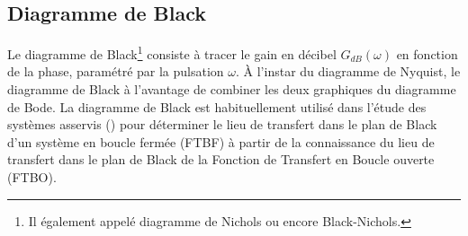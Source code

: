 \subsection{Diagramme de Black}
Le diagramme de Black\footnote{Il également appelé diagramme de Nichols ou encore Black-Nichols.} 
consiste à tracer le gain en décibel $G_{dB}(\omega)$ 
en fonction de la phase, paramétré par la pulsation $\omega$. À l'instar du diagramme de Nyquist, le diagramme 
de Black à l'avantage de combiner les deux graphiques du diagramme de Bode.
La diagramme de Black est habituellement utilisé dans l'étude des systèmes asservis () 
pour déterminer le lieu de transfert dans le plan de Black d'un système en boucle fermée (FTBF) à partir 
de la connaissance du lieu de transfert dans le plan de Black de la Fonction de Transfert en Boucle ouverte (FTBO).


